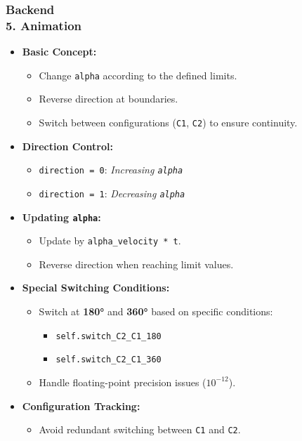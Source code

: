 \documentclass[ucs,10pt]{beamer}
\begin{document}
\begin{frame}
    \frametitle{Backend \\ \small \color{rwth-blue} 5. Animation}
    \begin{itemize}
        \item \textbf{Basic Concept:}
        \begin{itemize}
            \item Change \texttt{alpha} according to the defined limits.
            \item Reverse direction at boundaries.
            \item Switch between configurations (\texttt{C1}, \texttt{C2}) to ensure continuity.
        \end{itemize}

        \item \textbf{Direction Control:}
        \begin{itemize}
            \item \texttt{direction = 0}: \textit{Increasing \texttt{alpha}}
            \item \texttt{direction = 1}: \textit{Decreasing \texttt{alpha}}
        \end{itemize}

        \item \textbf{Updating \texttt{alpha}:}
        \begin{itemize}
            \item Update by \texttt{alpha\_velocity * t}.
            \item Reverse direction when reaching limit values.
        \end{itemize}

        \item \textbf{Special Switching Conditions:}
        \begin{itemize}
            \item Switch at \textbf{180°} and \textbf{360°} based on specific conditions:
            \begin{itemize}
                \item \texttt{self.switch\_C2\_C1\_180}
                \item \texttt{self.switch\_C2\_C1\_360}
            \end{itemize}
            \item Handle floating-point precision issues (\(10^{-12}\)).
        \end{itemize}

        \item \textbf{Configuration Tracking:}
        \begin{itemize}
            \item Avoid redundant switching between \texttt{C1} and \texttt{C2}.
        \end{itemize}
    \end{itemize}
\end{frame}
\end{document}
